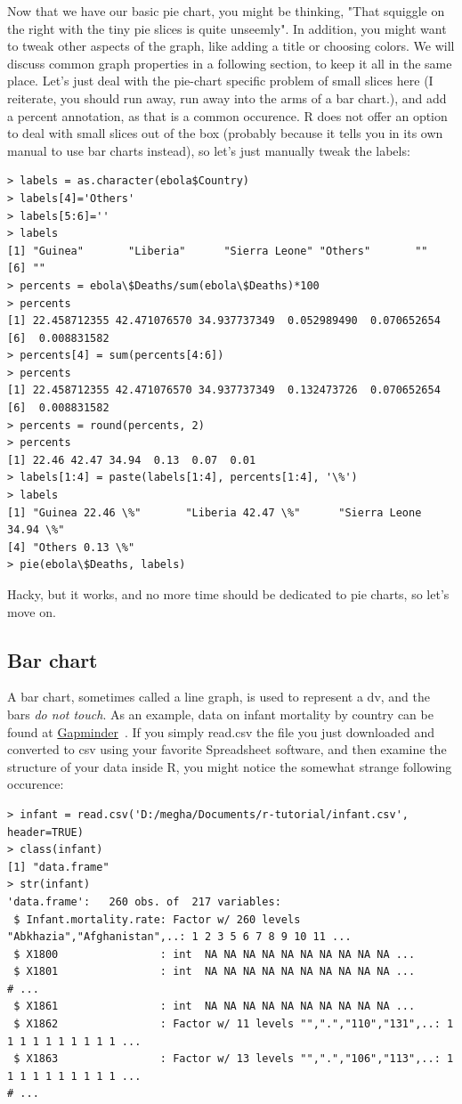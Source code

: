 \documentclass{report}
\newcommand{\code}[1]{\textsf{\ttfamily #1}}
\begin{document}
Now that we have our basic pie chart, you might be thinking, "That squiggle on the right with the tiny pie slices is quite unseemly". In addition, you might want to tweak other aspects of the graph, like adding a title or choosing colors. We will discuss common graph properties in a following section, to keep it all in the same place. Let's just deal with the pie-chart specific problem of small slices here (I reiterate, you should run away, run away into the arms of a bar chart.), and add a percent annotation, as that is a common occurence. R does not offer an option to deal with small slices out of the box (probably because it tells you in its own manual to use bar charts instead), so let's just manually tweak the labels:
\begin{verbatim}
> labels = as.character(ebola$Country)
> labels[4]='Others'
> labels[5:6]=''
> labels
[1] "Guinea"       "Liberia"      "Sierra Leone" "Others"       ""            
[6] ""
> percents = ebola\$Deaths/sum(ebola\$Deaths)*100
> percents
[1] 22.458712355 42.471076570 34.937737349  0.052989490  0.070652654
[6]  0.008831582
> percents[4] = sum(percents[4:6])
> percents
[1] 22.458712355 42.471076570 34.937737349  0.132473726  0.070652654
[6]  0.008831582
> percents = round(percents, 2)
> percents
[1] 22.46 42.47 34.94  0.13  0.07  0.01
> labels[1:4] = paste(labels[1:4], percents[1:4], '\%')
> labels
[1] "Guinea 22.46 \%"       "Liberia 42.47 \%"      "Sierra Leone 34.94 \%"
[4] "Others 0.13 \%"
> pie(ebola\$Deaths, labels)
\end{verbatim}
Hacky, but it works, and no more time should be dedicated to pie charts, so let's move on.

	\subsection{Bar chart}
A bar chart, sometimes called a line graph, is used to represent a \gls{dv}, and the bars \emph{do not touch}. As an example, data on infant mortality by country can be found at \href{https://docs.google.com/spreadsheets/d/1OHMMuHbSFKDolNHXsmgHYlkjSKfAZyyY1P-ddMu_Fz0/pub}{Gapminder}~\cite{gapminder}. If you simply \code{read.csv} the file you just downloaded and converted to csv using your favorite Spreadsheet software, and then examine the structure of your data inside R, you might notice the somewhat strange following occurence:
\begin{verbatim}
> infant = read.csv('D:/megha/Documents/r-tutorial/infant.csv', header=TRUE)
> class(infant)
[1] "data.frame"
> str(infant)
'data.frame':   260 obs. of  217 variables:
 $ Infant.mortality.rate: Factor w/ 260 levels "Abkhazia","Afghanistan",..: 1 2 3 5 6 7 8 9 10 11 ...
 $ X1800                : int  NA NA NA NA NA NA NA NA NA NA ...
 $ X1801                : int  NA NA NA NA NA NA NA NA NA NA ...
# ...
 $ X1861                : int  NA NA NA NA NA NA NA NA NA NA ...
 $ X1862                : Factor w/ 11 levels "",".","110","131",..: 1 1 1 1 1 1 1 1 1 1 ...
 $ X1863                : Factor w/ 13 levels "",".","106","113",..: 1 1 1 1 1 1 1 1 1 1 ...
# ... 
\end{verbatim}
\end{document}
